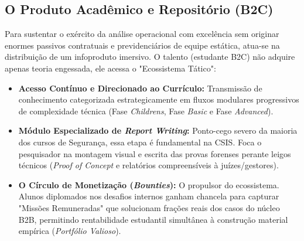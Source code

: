 \documentclass[../main.tex]{subfiles}
\begin{document}
\subsection{O Produto Acadêmico e Repositório (B2C)}
Para sustentar o exército da análise operacional com excelência sem originar enormes passivos contratuais e previdenciários de equipe estática, atua-se na distribuição de um infoproduto imersivo. O talento (estudante B2C) não adquire apenas teoria engessada, ele acessa o "Ecossistema Tático":
\begin{itemize}
    \item \textbf{Acesso Contínuo e Direcionado ao Currículo:} Transmissão de conhecimento categorizada estrategicamente em fluxos modulares progressivos de complexidade técnica (Fase \textit{Childrens}, Fase \textit{Basic} e Fase \textit{Advanced}).
    \item \textbf{Módulo Especializado de \textit{Report Writing}:} Ponto-cego severo da maioria dos cursos de Segurança, essa etapa é fundamental na CSIS. Foca o pesquisador na montagem visual e escrita das provas forenses perante leigos técnicos (\textit{Proof of Concept} e relatórios compreensíveis à juízes/gestores).
    \item \textbf{O Círculo de Monetização (\textit{Bounties}):} O propulsor do ecossistema. Alunos diplomados nos desafios internos ganham chancela para capturar "Missões Remuneradas" que solucionam frações reais dos casos do núcleo B2B, permitindo rentabilidade estudantil simultânea à construção material empírica (\textit{Portfólio Valioso}).
\end{itemize}
\end{document}
